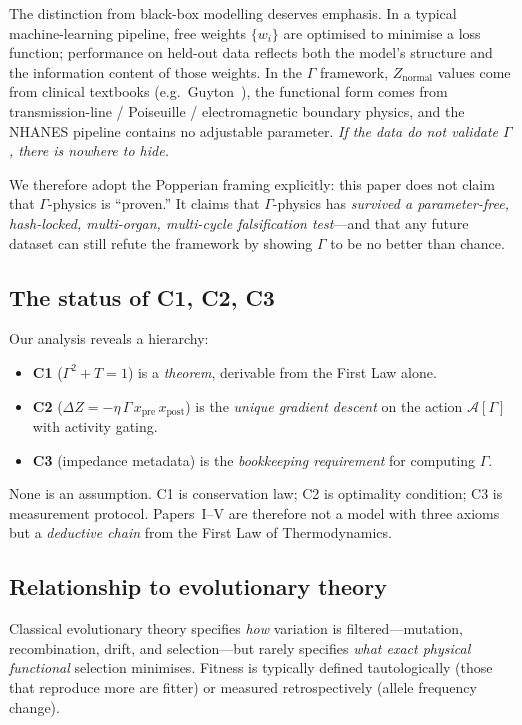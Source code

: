 \documentclass[aps,pre,twocolumn,superscriptaddress,floatfix]{revtex4-2}
\begin{document}
The distinction from black-box modelling deserves emphasis.
In a typical machine-learning pipeline, free weights
$\{w_i\}$ are optimised to minimise a loss function;
performance on held-out data reflects both the model's
structure and the information content of those weights.
In the $\Gamma$ framework, $Z_{\text{normal}}$ values
come from clinical textbooks (e.g.\ Guyton~\cite{Guyton2020}),
the functional form comes from transmission-line /
Poiseuille / electromagnetic boundary physics, and
the NHANES pipeline contains no adjustable parameter.
\emph{If the data do not validate $\Gamma$, there is
nowhere to hide.}

We therefore adopt the Popperian framing explicitly:
this paper does not claim that $\Gamma$-physics is
``proven.''  It claims that $\Gamma$-physics has
\emph{survived a parameter-free, hash-locked,
multi-organ, multi-cycle falsification test}---and
that any future dataset can still refute the framework
by showing $\Gamma$ to be no better than chance.

\subsection{The status of C1, C2, C3}

Our analysis reveals a hierarchy:
\begin{itemize}
  \item \textbf{C1} ($\Gamma^2+T=1$) is a \emph{theorem},
    derivable from the First Law alone.
  \item \textbf{C2} ($\Delta Z = -\eta\,\Gamma\,x_{\text{pre}}\,
    x_{\text{post}}$) is the \emph{unique gradient descent}
    on the action $\mathcal{A}[\Gamma]$ with activity gating.
  \item \textbf{C3} (impedance metadata) is the
    \emph{bookkeeping requirement} for computing $\Gamma$.
\end{itemize}
None is an assumption.  C1 is conservation law;
C2 is optimality condition; C3 is measurement protocol.
Papers~I--V are therefore not a model with three axioms
but a \emph{deductive chain} from the First Law of
Thermodynamics.

\subsection{Relationship to evolutionary theory}
\label{sec:evolution}

Classical evolutionary theory specifies \emph{how} variation
is filtered---mutation, recombination, drift, and
selection---but rarely specifies \emph{what exact physical
functional} selection minimises.
Fitness is typically defined tautologically (those that
reproduce more are fitter) or measured retrospectively
(allele frequency change).
\end{document}
